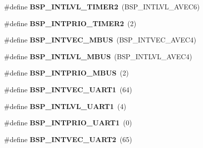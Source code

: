 \begin{DoxyCompactItemize}
\#define {\bfseries B\+S\+P\+\_\+\+I\+N\+T\+L\+V\+L\+\_\+\+T\+I\+M\+E\+R2}~(B\+S\+P\+\_\+\+I\+N\+T\+L\+V\+L\+\_\+\+A\+V\+E\+C6)
\item 
\mbox{\label{group__RTEMSBSPsM68kMCF5206Elite_ga0d8c28a021def745cd13a2bedbcd9d53}} 
\#define {\bfseries B\+S\+P\+\_\+\+I\+N\+T\+P\+R\+I\+O\+\_\+\+T\+I\+M\+E\+R2}~(2)
\item 
\mbox{\label{group__RTEMSBSPsM68kMCF5206Elite_gaea12a898cc416c511228160e7bab7a6d}} 
\#define {\bfseries B\+S\+P\+\_\+\+I\+N\+T\+V\+E\+C\+\_\+\+M\+B\+US}~(B\+S\+P\+\_\+\+I\+N\+T\+V\+E\+C\+\_\+\+A\+V\+E\+C4)
\item 
\mbox{\label{group__RTEMSBSPsM68kMCF5206Elite_ga4ea8a1a3dfa89dfdcd1d13af23a936f2}} 
\#define {\bfseries B\+S\+P\+\_\+\+I\+N\+T\+L\+V\+L\+\_\+\+M\+B\+US}~(B\+S\+P\+\_\+\+I\+N\+T\+L\+V\+L\+\_\+\+A\+V\+E\+C4)
\item 
\mbox{\label{group__RTEMSBSPsM68kMCF5206Elite_gab43024aa92cc30b8f41459150db7e012}} 
\#define {\bfseries B\+S\+P\+\_\+\+I\+N\+T\+P\+R\+I\+O\+\_\+\+M\+B\+US}~(2)
\item 
\mbox{\label{group__RTEMSBSPsM68kMCF5206Elite_ga10baa941569a4ef297ceaf481e7ff6fe}} 
\#define {\bfseries B\+S\+P\+\_\+\+I\+N\+T\+V\+E\+C\+\_\+\+U\+A\+R\+T1}~(64)
\item 
\mbox{\label{group__RTEMSBSPsM68kMCF5206Elite_ga4fd62389440c076a0f970a5ea467edbe}} 
\#define {\bfseries B\+S\+P\+\_\+\+I\+N\+T\+L\+V\+L\+\_\+\+U\+A\+R\+T1}~(4)
\item 
\mbox{\label{group__RTEMSBSPsM68kMCF5206Elite_ga71e649bbc1c0c9674bb520299961d288}} 
\#define {\bfseries B\+S\+P\+\_\+\+I\+N\+T\+P\+R\+I\+O\+\_\+\+U\+A\+R\+T1}~(0)
\item 
\mbox{\label{group__RTEMSBSPsM68kMCF5206Elite_ga93e1fc0113b532b8c6ba4703225ab45e}} 
\#define {\bfseries B\+S\+P\+\_\+\+I\+N\+T\+V\+E\+C\+\_\+\+U\+A\+R\+T2}~(65)
\item 
\mbox{\label{group__RTEMSBSPsM68kMCF5206Elite_ga01ef9f5c0b21dfa5ace7ed3d5bf84caa}} 

\end{DoxyCompactItemize}
